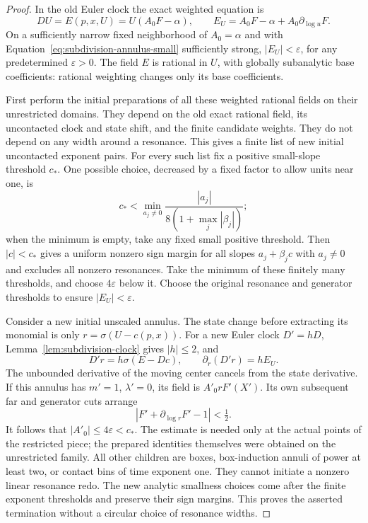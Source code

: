 \begin{proof}
In the old Euler clock the exact weighted equation is
\[
 DU=E(p,x,U)=U(A_0F-\alpha),\qquad
 E_U=A_0F-\alpha+A_0\partial_{\log u}F.
\]
On a sufficiently narrow fixed neighborhood of $A_0=\alpha$ and with
Equation~\eqref{eq:subdivision-annulus-small} sufficiently strong,
$|E_U|<\varepsilon$, for any predetermined $\varepsilon>0$.
The field $E$ is rational in $U$, with globally subanalytic base
coefficients: rational weighting changes only its base coefficients.

First perform the initial preparations of all these weighted rational
fields on their unrestricted domains.  They depend on the old exact
rational field, its uncontacted clock and state shift, and the finite
candidate weights.  They do not depend on any width around a resonance.
This gives a finite list of new initial uncontacted exponent pairs.
For every such list fix a positive small-slope threshold $c_*$.  One
possible choice, decreased by a fixed factor to allow units near one,
is
\[
 c_*<\min_{a_j\ne0}\frac{|a_j|}{8(1+\max_j|\beta_j|)};
\]
when the minimum is empty, take any fixed small positive threshold.
Then $|c|<c_*$ gives a uniform nonzero sign margin for all slopes
$a_j+\beta_jc$ with $a_j\ne0$ and excludes all nonzero resonances.
Take the minimum of these finitely many thresholds, and choose
$4\varepsilon$ below it.  Choose the original resonance and generator
thresholds to ensure $|E_U|<\varepsilon$.

Consider a new initial unscaled annulus.  The state change before
extracting its monomial is only $r=\sigma(U-c(p,x))$.  For a new Euler
clock $D'=hD$, Lemma~\ref{lem:subdivision-clock} gives $|h|\le2$, and
\[
 D'r=h\sigma(E-Dc),\qquad \partial_r(D'r)=hE_U.
\]
The unbounded derivative of the moving center cancels from the state
derivative.  If this annulus has $m'=1$, $\lambda'=0$, its field is
$A'_0rF'(X')$.  Its own subsequent far and generator cuts arrange
\[
 |F'+\partial_{\log r}F'-1|<\tfrac12.
\]
It follows that $|A'_0|\le4\varepsilon<c_*$.  The estimate is needed
only at the actual points of the restricted piece; the prepared
identities themselves were obtained on the unrestricted family.
All other children are boxes, box-induction annuli of power at least
two, or contact bins of time exponent one.  They cannot initiate a
nonzero linear resonance redo.  The new analytic smallness choices
come after the finite exponent thresholds and preserve their sign
margins.  This proves the asserted termination without a circular
choice of resonance widths.
\end{proof}

